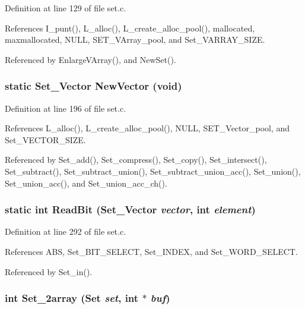 Definition at line 129 of file set.c.

References I\_\-punt(), L\_\-alloc(), L\_\-create\_\-alloc\_\-pool(), mallocated, maxmallocated, NULL, SET\_\-VArray\_\-pool, and Set\_\-VARRAY\_\-SIZE.

Referenced by Enlarge\-VArray(), and New\-Set().
\subsubsection{\setlength{\rightskip}{0pt plus 5cm}static \bf{Set\_\-Vector} New\-Vector (void)\hspace{0.3cm}{\tt  [static]}}\label{set_8c_3f3626d5e17c35ace574d401289bbb86}




Definition at line 196 of file set.c.

References L\_\-alloc(), L\_\-create\_\-alloc\_\-pool(), NULL, SET\_\-Vector\_\-pool, and Set\_\-VECTOR\_\-SIZE.

Referenced by Set\_\-add(), Set\_\-compress(), Set\_\-copy(), Set\_\-intersect(), Set\_\-subtract(), Set\_\-subtract\_\-union(), Set\_\-subtract\_\-union\_\-acc(), Set\_\-union(), Set\_\-union\_\-acc(), and Set\_\-union\_\-acc\_\-ch().
\subsubsection{\setlength{\rightskip}{0pt plus 5cm}static int Read\-Bit (\bf{Set\_\-Vector} {\em vector}, int {\em element})\hspace{0.3cm}{\tt  [static]}}\label{set_8c_ec7672bce278f551f2fcdd82cd0622ec}




Definition at line 292 of file set.c.

References ABS, Set\_\-BIT\_\-SELECT, Set\_\-INDEX, and Set\_\-WORD\_\-SELECT.

Referenced by Set\_\-in().
\subsubsection{\setlength{\rightskip}{0pt plus 5cm}int Set\_\-2array (\bf{Set} {\em set}, int $\ast$ {\em buf})}\label{set_8c_4a077bf3104d88db50a8d71a64333936}




